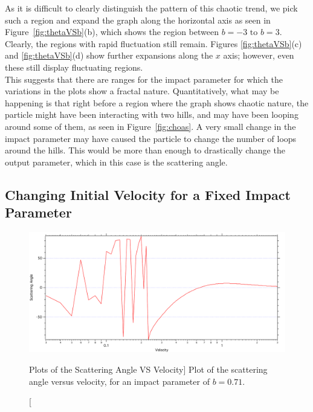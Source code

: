 \documentclass[12pt]{article} %
\begin{document}
As it is difficult to clearly distinguish the pattern of this chaotic trend, we pick such a region and expand the graph along the horizontal axis as seen in Figure~\ref{fig:thetaVSb}(b), which shows the region between $b=-3\text{ to } b=3$. Clearly, the regions with rapid fluctuation still remain. Figures \ref{fig:thetaVSb}(c) and \ref{fig:thetaVSb}(d) show further expansions along the $x$ axis; however, even these still display fluctuating regions. \\ 

This suggests that there are ranges for the impact parameter for which the variations in the plots show a fractal nature. Quantitatively, what may be happening is that right before a region where the graph shows chaotic nature, the particle might have been interacting with two hills, and may have been looping around some of them, as seen in Figure~\ref{fig:choas}. A very small change in the impact parameter may have caused the particle to change the number of loops around the hills. This would be more than enough to drastically change the output parameter, which in this case is the scattering angle.\\




\subsection{Changing Initial Velocity for a Fixed Impact Parameter} \label{CompVeltoAngle}

\begin{figure}[H]
	\begin{center}
		\includegraphics[width=1.1\linewidth]{ScatVSvel}
		\caption
		[Plots of the Scattering Angle VS Velocity]
		{Plot of the scattering angle versus velocity, for an impact parameter of $b=0.71$.}
		\label{fig:ScatVSvel}
	\end{center}
\end{figure}
\end{document}
